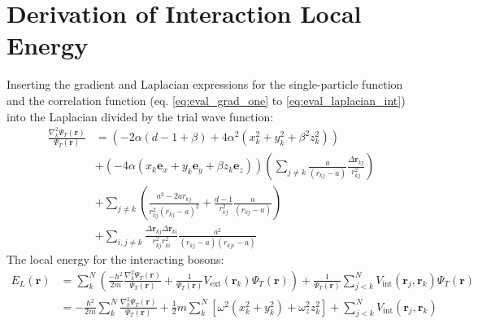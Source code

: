 \documentclass[12pt,a4paper,english]{article}
\begin{document}
\section{Derivation of Interaction Local Energy}
\label{appendix:local_E}
Inserting the gradient and Laplacian expressions for the single-particle function and the correlation function (eq. \ref{eq:eval_grad_one} to \ref{eq:eval_laplacian_int}) into the Laplacian divided by the trial wave function:
\begin{align}
\label{eq:H_int_deriv}
\frac{\nabla_k^2\Psi_T(\textbf{r})}{\Psi_T(\textbf{r})}&= \left(-2\alpha(d-1+\beta)+4\alpha^2(x_k^2+y_k^2+\beta^2z_k^2)\right)\nonumber\\
&+\left(-4\alpha(x_k\textbf{e}_x+y_k\textbf{e}_y+\beta z_k\textbf{e}_z)\right)\left(\sum_{j\neq k}\frac{a}{(r_{kj}-a)}\frac{\Delta\textbf{r}_{kj}}{r_{kj}^2}\right)\nonumber\\
&+\sum_{j\neq k}\left(\frac{a^2-2ar_{kj}}{r_{kj}^2(r_{kj}-a)^2}+\frac{d-1}{r_{kj}^2}\frac{a}{(r_{kj}-a)}\right)\nonumber\\
&+\sum_{i,j\neq k}\frac{\Delta \textbf{r}_{kj}\Delta \textbf{r}_{ki}}{r_{kj}^2r_{ki}^2}\frac{a^2}{(r_{kj}-a)(r_{kji}-a)}
\end{align}
The local energy for the interacting bosons:
\begin{align}
\label{eq:local_E_deriv}
E_L(\textbf{r})&=\sum_k^N\left(\frac{-\hbar^2}{2m}\frac{\nabla_k^2\Psi_T(\textbf{r})}{\Psi_T(\textbf{r})}+\frac{1}{\Psi_T(\mathbf{r})}V_{\text{ext}}(\textbf{r}_k)\Psi_T(\mathbf{r})\right)+\frac{1}{\Psi_T(\mathbf{r})}\sum_{j<k}^{N}V_{\text{int}}(\textbf{r}_j,\textbf{r}_k)\Psi_T(\mathbf{r})\nonumber\\
&=-\frac{\hbar^2}{2m}\sum_k^N\frac{\nabla_k^2\Psi_T(\textbf{r})}{\Psi_T(\textbf{r})}
+\frac{1}{2}m\sum_k^N[\omega^2(x_k^2+y_k^2) + \omega_z^2z_k^2]
+\sum_{j<k}^{N}V_{\text{int}}(\textbf{r}_j,\textbf{r}_k)
\end{align}



\end{document}
